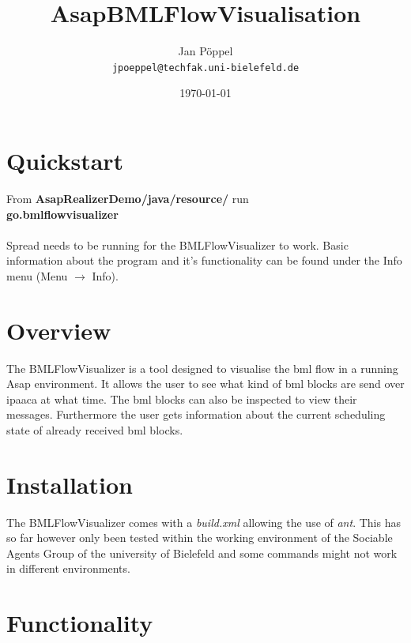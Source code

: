 \documentclass[12pt,a4paper]{article}
\begin{document}
\title{\bf{AsapBMLFlowVisualisation}}
\date{\today}
\author{Jan Pöppel \\[3mm]
{\tt jpoeppel@techfak.uni-bielefeld.de}}
\maketitle\thispagestyle{empty}

\section*{Quickstart}

From \textbf{AsapRealizerDemo/java/resource/} run \\
\textbf{go.bmlflowvisualizer} 
~\\~\\
Spread needs to be running for the BMLFlowVisualizer to work.
Basic information about the program and it's functionality can be found under the 
Info menu (Menu $\rightarrow$ Info).

\tableofcontents

\clearpage
\section{Overview}

The BMLFlowVisualizer is a tool designed to visualise the bml flow in a running Asap environment. It allows the user to see what kind of bml blocks are send over 
ipaaca at what time. The bml blocks can also be inspected to view their messages. 
Furthermore the user gets information about the current scheduling state of already received bml blocks. 

\section{Installation}

The BMLFlowVisualizer comes with a \textit{build.xml} allowing the use of \textit{ant}. This has so far however only been tested within the working environment of the Sociable Agents Group of the university of Bielefeld and some commands might not work in different environments.

\section{Functionality}
\end{document}
